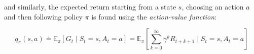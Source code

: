 and similarly, the expected return starting from a state $s$, choosing an action $a$ and then following policy $\pi$ is found using the \textit{action-value function}:

\begin{equation}
q_\pi\left(s,a\right) \doteq \mathbb{E}_\pi\left[G_t \mid S_t=s, A_t=a\right] = \mathbb{E}_\pi\left[\sum^{\infty}_{k=0}\gamma^kR_{t+k+1}\mid S_t=s, A_t=a\right]
\end{equation}

